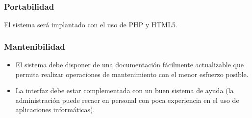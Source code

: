 \subsubsection{Portabilidad}

El sistema será implantado con el uso de PHP y HTML5. 


\subsubsection{Mantenibilidad}
\begin{itemize}
\item El sistema debe disponer de una documentación fácilmente actualizable que permita realizar operaciones de mantenimiento con el menor esfuerzo posible.
\item La interfaz debe estar complementada con un buen sistema de ayuda (la administración puede recaer en personal con poca experiencia en el uso de aplicaciones informáticas). 
\end{itemize}



